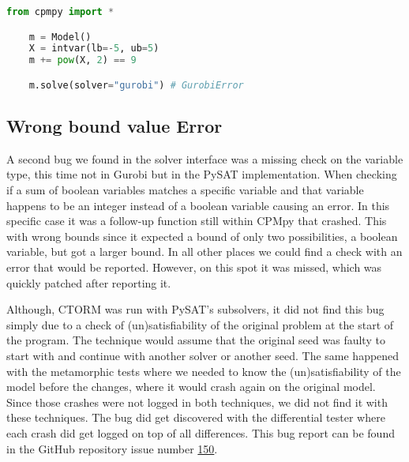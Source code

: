 \begin{lstlisting}[language=python, label={lst:Bug:PowGurobi}, caption={The “power function of Gurobi”-bug.}]
	from cpmpy import *

	m = Model()
	X = intvar(lb=-5, ub=5)
	m += pow(X, 2) == 9

	m.solve(solver="gurobi") # GurobiError
\end{lstlisting}



\subsection{Wrong bound value Error}
\label{res:bug:WrongBounds}
A second bug we found in the solver interface was a missing check on the variable type, this time not in Gurobi but in the PySAT implementation. When checking if a sum of boolean variables matches a specific variable and that variable happens to be an integer instead of a boolean variable causing an error. In this specific case it was a follow-up function still within CPMpy that crashed. This with wrong bounds since it expected a bound of only two possibilities, a boolean variable, but got a larger bound. In all other places we could find a check with an error that would be reported. However, on this spot it was missed, which was quickly patched after reporting it.

Although, CTORM was run with PySAT’s subsolvers, it did not find this bug simply due to a check of (un)satisfiability of the original problem at the start of the program. The technique would assume that the original seed was faulty to start with and continue with another solver or another seed. The same happened with the metamorphic tests where we needed to know the (un)satisfiability of the model before the changes, where it would crash again on the original model. Since those crashes were not logged in both techniques, we did not find it with these techniques. The bug did get discovered with the differential tester where each crash did get logged on top of all differences. This bug report can be found in the GitHub repository issue number \href{https://github.com/CPMpy/cpmpy/issues/150}{150}.

%
%

